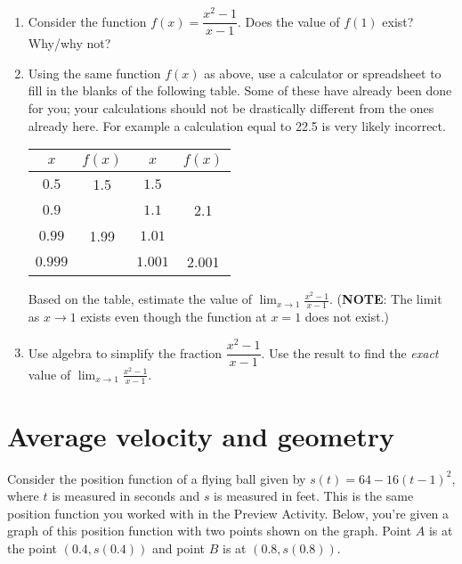 \documentclass[11pt]{article}
\begin{document}
\begin{enumerate}
	\item Consider the function $f(x) = \dfrac{x^2 - 1}{x - 1}$. Does the value of $f(1)$ exist? Why/why not?
	
	\vspace{0.3in}
	
	\item Using the same function $f(x)$ as above, use a calculator or spreadsheet to fill in the blanks of the following table. Some of these have already been done for you; your calculations should not be drastically different from the ones already here. For example a calculation equal to 22.5 is very likely incorrect. 
	\begin{center}
		\begin{tabular}{c|c||c|c}
		$x$ & $f(x)$ & $x$ & $f(x)$ \\ \hline
		$0.5$ & 1.5 & $1.5$ & \hspace{1in} \\
		$0.9$ & \hspace{1in} & $1.1$ & 2.1 \\
		$0.99$ & 1.99 & $1.01$ & \hspace{1in} \\
		$0.999$ & \hspace{1in} & $1.001$ & 2.001 \\
		\end{tabular}
	\end{center}
Based on the table, estimate the value of $\displaystyle{\lim_{x \to 1} \frac{x^2 - 1}{x-1}}$. (\textbf{NOTE}: The limit as $x \to 1$ exists even though the function at $x=1$ does not exist.)

	\item Use algebra to simplify the fraction $\dfrac{x^2 - 1}{x - 1}$. Use the result to find the \emph{exact} value of $\displaystyle{\lim_{x \to 1} \frac{x^2 - 1}{x-1}}$.  
	
	
	
\end{enumerate}


\vfill

\section{Average velocity and geometry}

Consider the position function of a flying ball given by $s(t) = 64 - 16(t-1)^2$, where $t$ is measured in seconds and $s$ is measured in feet. This is the same position function you worked with in the Preview Activity. Below, you're given a graph of this position function with two points shown on the graph. Point $A$ is at the point $(0.4, s(0.4))$ and point $B$ is at $(0.8, s(0.8))$. 
\end{document}
